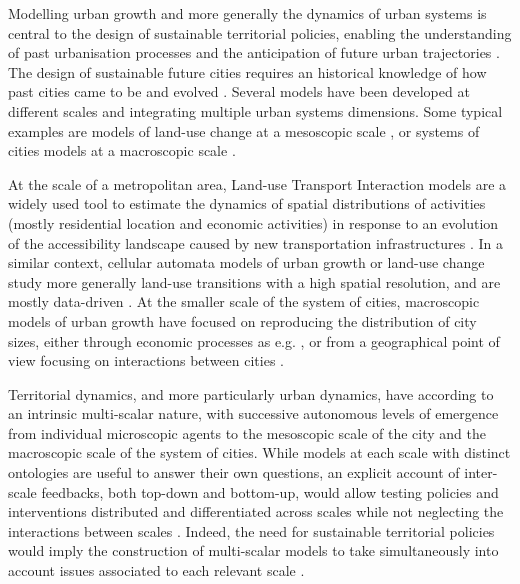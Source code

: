 \documentclass[referee,lineno,pdflatex,sn-apa]{sn-jnl}
\begin{document}
Modelling urban growth and more generally the dynamics of urban systems is central to the design of sustainable territorial policies, enabling the understanding of past urbanisation processes and the anticipation of future urban trajectories \citep{pumain2017urban}. The design of sustainable future cities requires an historical knowledge of how past cities came to be and evolved \citep{batty2018inventing}. Several models have been developed at different scales and integrating multiple urban systems dimensions. Some typical examples are models of land-use change at a mesoscopic scale \citep{iacono2008models}, or systems of cities models at a macroscopic scale \citep{raimbault2020empowering}.

At the scale of a metropolitan area, Land-use Transport Interaction models \citep{wegener2004land} are a widely used tool to estimate the dynamics of spatial distributions of activities (mostly residential location and economic activities) in response to an evolution of the accessibility landscape caused by new transportation infrastructures \citep{raimbault:halshs-02265423}. In a similar context, cellular automata models of urban growth or land-use change study more generally land-use transitions with a high spatial resolution, and are mostly data-driven \citep{clarke2007decade}. At the smaller scale of the system of cities, macroscopic models of urban growth have focused on reproducing the distribution of city sizes, either through economic processes as e.g. \citep{gabaix1999zipf}, or from a geographical point of view focusing on interactions between cities \citep{favaro2011gibrat}.

Territorial dynamics, and more particularly urban dynamics, have according to \cite{pumain1997pour} an intrinsic multi-scalar nature, with successive autonomous levels of emergence from individual microscopic agents to the mesoscopic scale of the city and the macroscopic scale of the system of cities. While models at each scale with distinct ontologies are useful to answer their own questions, an explicit account of inter-scale feedbacks, both top-down and bottom-up, would allow testing policies and interventions distributed and differentiated across scales while not neglecting the interactions between scales \citep{wegener2018multi}. Indeed, the need for sustainable territorial policies would imply the construction of multi-scalar models to take simultaneously into account issues associated to each relevant scale \citep{Rozenblat2018,raimbault:halshs-02284933}.


\end{document}
